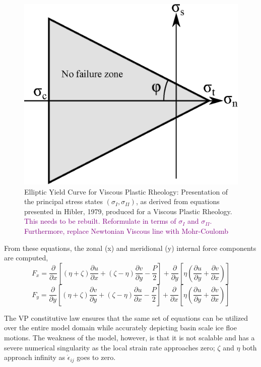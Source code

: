 \begin{figure}[!htb]
\centering
\includegraphics[width=4.5in]{figs/Mohr_Coulomb.eps}
\caption{Elliptic Yield Curve for Viscous Plastic Rheology: Presentation of the principal stress states $(\sigma_{I},\sigma_{II})$, as derived from equations presented in Hibler, 1979, produced for a Viscous Plastic Rheology.  \textcolor{purple}{This needs to be rebuilt.  Reformulate in terms of $\sigma_I$ and $\sigma_{II}$.  Furthermore, replace Newtonian Viscous line with Mohr-Coulomb}}
\label{fig:Elliptic_Mohr_Coulomb}
\end{figure}

From these equations, the zonal (x) and meridional (y) internal force components are computed,
\begin{equation}
F_x = \frac{\partial}{\partial x} \left[ (\eta+\zeta) \frac{\partial u}{\partial x} + (\zeta - \eta) \frac{\partial v}{\partial y} - \frac{P}{2}\right] + \frac{\partial}{\partial y} \left[ \eta \left( \frac{\partial u}{\partial y} + \frac{\partial v}{\partial x} \right) \right]
\end{equation}
\begin{equation}
F_y = \frac{\partial}{\partial y} \left[ (\eta+\zeta) \frac{\partial v}{\partial y} + (\zeta - \eta) \frac{\partial u}{\partial x} - \frac{P}{2}\right] + \frac{\partial}{\partial x} \left[ \eta \left( \frac{\partial u}{\partial y} + \frac{\partial v}{\partial x} \right) \right]
\end{equation}

The \ac{VP} constitutive law ensures that the same set of equations can be utilized over the entire model domain while accurately depicting basin scale ice floe motions.  The weakness of the model, however, is that it is not scalable and has a severe numerical singularity as the local strain rate approaches zero; $\zeta$ and $\eta$ both approach infinity as $\dot{\epsilon}_{ij}$ goes to zero.

